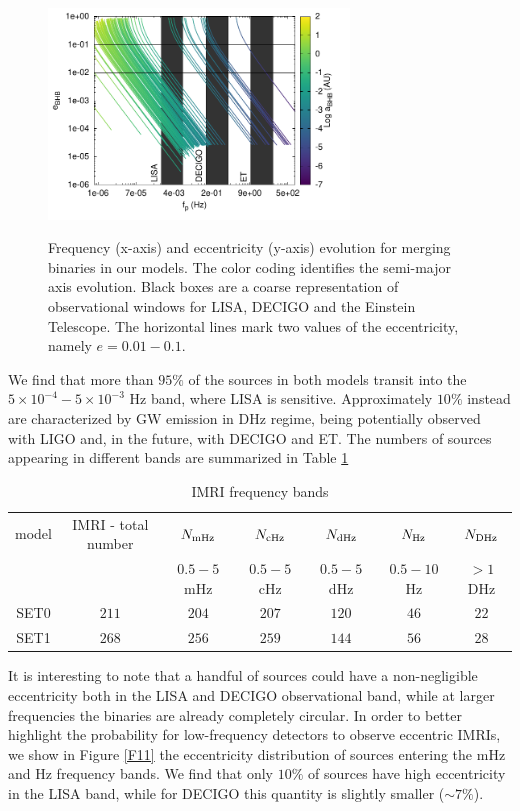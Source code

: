 \documentclass[useAMS,usenatbib]{mn2e}
\begin{document}
\begin{figure}
\centering
\includegraphics[width=8cm]{freq_evo}\\
\caption{Frequency (x-axis) and eccentricity (y-axis) evolution for merging binaries in our models. The color coding identifies the semi-major axis evolution. Black boxes are a coarse representation of observational windows for LISA, DECIGO and the Einstein Telescope. The horizontal lines mark two values of the eccentricity, namely $e=0.01-0.1$.}
\label{F10}
\end{figure}

We find that more than $95\%$ of the sources in both models transit into the $5\times 10^{-4} - 5\times 10^{-3}$ Hz band, where LISA is sensitive. Approximately $10\%$ instead are characterized by GW emission in DHz regime, being potentially observed with LIGO and, in the future, with DECIGO and ET.
The numbers of sources appearing in different bands are summarized in Table \ref{tab:t4}
 
 \begin{table}
     \centering
     \caption{IMRI frequency bands}
     \begin{tabular}{ccccccc}
        \hline
        \hline
        model & IMRI - total number & $N_{\rm mHz}$ & $N_{\rm cHz}$ & $N_{\rm dHz}$ & $N_{\rm Hz}$ & $N_{\rm DHz}$ \\ 
              &                     &$0.5-5$ mHz    & $ 0.5-5$ cHz  &  $0.5-5$ dHz & $0.5-10$ Hz & $>1$ DHz \\
        \hline
        SET0 & $211$ & $204$ &  $207$ & $120$ & $46$ & $22$   \\
        SET1 & $268$ & $256$ &  $259$ & $144$ & $56$ & $28$   \\
        \hline
     \end{tabular}
     \label{tab:t4}
 \end{table}
 
 
It is interesting to note that a handful of sources could have a non-negligible eccentricity both in the LISA and DECIGO observational band, while at larger frequencies the binaries are already completely circular. In order to better highlight the probability for low-frequency detectors to observe eccentric IMRIs, we show in Figure \ref{F11} the eccentricity distribution of sources entering the mHz and Hz frequency bands. We find that only $10\%$ of sources have high eccentricity in the LISA band, while for DECIGO this quantity is slightly smaller ($\sim 7\%$).
 
\end{document}
